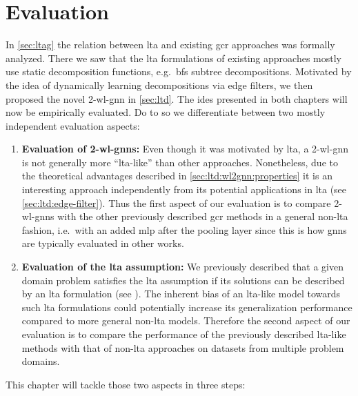 \chapter{Evaluation}%
\label{sec:eval}

In \cref{sec:ltag} the relation between \ac{lta} and existing \ac{gcr} approaches was formally analyzed.
There we saw that the \ac{lta} formulations of existing approaches mostly use static decomposition functions, e.g.\ \ac{bfs} subtree decompositions.
Motivated by the idea of dynamically learning decompositions via edge filters, we then proposed the novel 2-\acs{wl}-\acs{gnn} in \cref{sec:ltd}.
The ides presented in both chapters will now be empirically evaluated.
Do to so we differentiate between two mostly independent evaluation aspects:
\begin{enumerate}[label={\textbf{\arabic*.}}]
	\item \textbf{Evaluation of 2-\acs{wl}-\acsp{gnn}:}
		Even though it was motivated by \ac{lta}, a 2-\acs{wl}-\acs{gnn} is not generally more ``\acs{lta}-like'' than other approaches.
		Nonetheless, due to the theoretical advantages described in \cref{sec:ltd:wl2gnn:properties} it is an interesting approach independently from its potential applications in \ac{lta} (see \cref{sec:ltd:edge-filter}).
		Thus the first aspect of our evaluation is to compare 2-\acs{wl}-\acsp{gnn} with the other previously described \ac{gcr} methods in a general non-\acs{lta} fashion, i.e.\ with an added \ac{mlp} after the pooling layer since this is how \acp{gnn} are typically evaluated in other works.
	\item \textbf{Evaluation of the \ac{lta} assumption:}
		We previously described that a given domain problem satisfies the \ac{lta} assumption if its solutions can be described by an \ac{lta} formulation (see ).
		The inherent bias of an \acs{lta}-like model towards such \ac{lta} formulations could potentially increase its generalization performance compared to more general non-\acs{lta} models.
		Therefore the second aspect of our evaluation is to compare the performance of the previously described \acs{lta}-like methods with that of non-\acs{lta} approaches on datasets from multiple problem domains.
\end{enumerate}
This chapter will tackle those two aspects in three steps:
